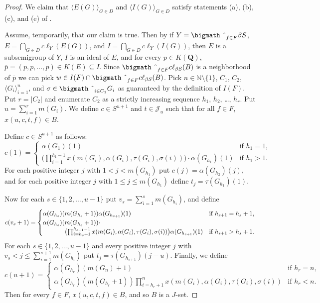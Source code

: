 \documentclass[12pt,showtrims]{memoir}
\theoremstyle{plain}
\theoremstyle{definition}
\newcommand{\la}{\langle}
\newcommand{\ra}{\rangle}
\newcommand{\bbN}{\mathbb{N}}
\newcommand{\calJ}{\mathcal{J}}
\newcommand{\bigtimes}{\hbox{\bigmath \char'2}}
\begin{document}
\begin{proof}
  We claim that $\la E(G) \ra_{G \in D}$ and $\la I(G) \ra_{G \in D}$ satisfy statements (a), (b), (c), and (e) of \cite[Lemma 14.9]{Hindman:1998fk}.

  Assume, temporarily, that our claim is true. 
  Then by \cite[Lemma 14.9]{Hindman:1998fk} if $Y = \bigtimes_{f \in F} \beta S$, $E = \bigcap_{G \in D} c\ell_Y(E(G))$, and $I = \bigcap_{G \in D} c\ell_Y(I(G))$, then $E$ is a subsemigroup of $Y$, $I$ is an ideal of $E$, and for every $p \in K(\mathbf{Q})$, $\overline{p} = (p, p, \ldots, p) \in K(E) \subseteq I$. 
  Since $\bigtimes_{f \in F} c\ell_{\beta S} (B)$ is a neighborhood of $\overline{p}$ we can pick $w \in I(F) \cap \bigtimes_{f \in F} c\ell_{\beta S} (B)$. 
  Pick $n \in \bbN\setminus \{1\}$, $C_1$, $C_2$, $\la G_i \ra_{i=1}^n$, and $\sigma \in \bigtimes_{i \in C_1} G_i$ as guaranteed by the definition of $I(F)$. 
  Put $r = |C_2|$ and enumerate $C_2$ as a strictly increasing sequence $h_1$, $h_2$, \dots, $h_r$.
  Put $u = \sum_{i=1}^r m(G_i)$.
  We define $c \in S^{u+1}$ and $t \in \calJ_u$ such that for all $f \in F$, $x(u, c, t, f) \in B$.

  Define $c \in S^{u+1}$ as follows:
  \[
    c(1) = 
    \begin{cases}
      \alpha(G_1)(1) & \mbox{if $h_1 = 1$,} \\
      \bigl(\prod_{i=1}^{h_1-1} x(m(G_i), \alpha(G_i), \tau(G_i), \sigma(i))\bigr) \cdot \alpha(G_{h_1})(1) & \mbox{if $h_1 > 1$.}
    \end{cases}
  \]
  For each positive integer $j$ with $1 < j < m(G_{h_1})$ put $c(j) = \alpha(G_{h_2})(j)$, and for each positive integer $j$ with $1 \le j \le m(G_{h_1})$ define $t_j = \tau(G_{h_1})(1)$. 

  Now for each $s \in \{1, 2, \ldots, u-1\}$ put $v_s = \sum_{i=1}^s m(G_{h_i})$, and define
  \[
    c(v_s+1) = 
    \begin{cases}
      \alpha(G_{h_s})(m(G_{h_s}+1))\alpha(G_{h_{s+1}})(1) & \mbox{if $h_{s+1} = h_s + 1$,} \\

      \alpha(G_{h_s})(m(G_{h_s}+1))\cdot & \\
      \hspace{3.5em}\bigl(\prod_{i=h_{s}+1}^{h_{s+1}-1} x(m(G_i), \alpha(G_i), \tau(G_i), \sigma(i))\bigr)\alpha(G_{h_{s+1}})(1) & \mbox{if $h_{s+1} > h_s+1$.}
    \end{cases}
  \]
  For each $s \in \{1, 2, \ldots, u-1\}$ and every positive integer $j$ with $v_s < j \le \sum_{i=1}^{s+1} m(G_{h_i})$ put $t_j = \tau(G_{h_{s+1}})(j-u)$. 
  Finally, we define
  \[
    c(u+1) = 
    \begin{cases}
      \alpha(G_{h_r})(m(G_n) + 1) & \mbox{if $h_r = n$,} \\
      \alpha(G_{h_r})(m(G_{h_r}+1))\prod_{i=h_r+1}^n x(m(G_i), \alpha(G_i), \tau(G_i), \sigma(i)) & \mbox{if $h_r < n$.}
    \end{cases}
  \]
  Then for every $f \in F$, $x(u, c, t, f) \in B$, and so $B$ is a $J$-set.


\end{proof}
\end{document}
